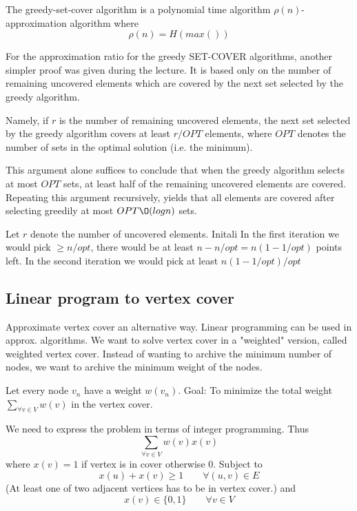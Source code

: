 \documentclass[10pt]{article}
\begin{document}
The greedy-set-cover algorithm is a polynomial time algorithm $\rho(n)$-approximation algorithm where 
\begin{equation}
  \rho(n) = H(max())
\end{equation}

For the approximation ratio for the greedy SET-COVER algorithms, another simpler proof was given during the lecture. It is based only on the number of remaining uncovered elements which are covered by the next set selected by the greedy algorithm. 

Namely, if $r$ is the number of remaining uncovered elements, the next set selected by the greedy algorithm covers at least $r/OPT$ elements, where $OPT$ denotes the number of sets in the optimal solution (i.e. the minimum). 

This argument alone suffices to conclude that when the greedy algorithm selects at most $OPT$ sets, at least half of the remaining uncovered elements are covered. Repeating this argument recursively, yields that all elements are covered after selecting greedily at most $OPT \O(log n)$ sets.

Let $r$ denote the number of uncovered elements. Initali  In the first iteration we would pick $\geq n/opt$, there would be at least $n-n/opt=n(1-1/opt)$ points left. In the second iteration we would pick at least $n(1-1/opt)/opt$





\subsection{Linear program to vertex cover} %
\label{sub:linear_program_to_set_cover}
Approximate vertex cover an alternative way. Linear programming can be used in approx. algorithms. We want to solve vertex cover in a "weighted" version, called weighted vertex cover. Instead of wanting to archive the minimum number of nodes, we want to archive the minimum weight of the nodes.

Let every node $v_n$ have a weight $w(v_n)$. Goal: To minimize the total weight $\sum_{\forall v \in V} w(v)$ in the vertex cover. 

We need to express the problem in terms of integer programming. Thus
\begin{equation}
\sum_{\forall v \in V} w(v) x(v)  
\end{equation}
where $x(v)=1$ if vertex is in cover otherwise $0$. Subject to
\begin{equation}
  x(u)+x(v) \geq 1 \qquad \forall (u,v) \in E
\end{equation}
(At least one of two adjacent vertices has to be in vertex cover.) and
\begin{equation}
    x(v)  \in \{0,1\} \qquad \forall v \in V 
\end{equation}
\end{document}
